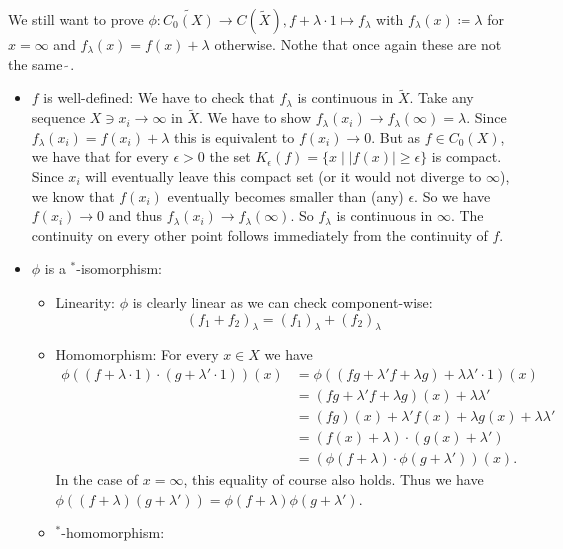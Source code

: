 \documentclass[a4paper]{article}
\begin{document}
\begin{exercise}[2.6]
\begin{itemize}
	\end{itemize}
	We still want to prove $\phi: \widetilde{C_0(X)} \to C(\tilde X), f + \lambda \cdot 1 \mapsto f_\lambda$ with $f_\lambda(x) \coloneq \lambda$ for $x = \infty$ and $f_\lambda(x) = f(x) + \lambda$ otherwise.
	Nothe that once again these are not the same $\tilde{~}$.
	\begin{itemize}
		\item $f$ is well-defined:
		We have to check that $f_\lambda$ is continuous in $\tilde X$.
		Take any sequence $X \ni x_i \to \infty$ in $\tilde X$. We have to show $f_\lambda(x_i) \to f_\lambda(\infty) = \lambda$. Since $f_\lambda(x_i) = f(x_i) + \lambda$ this is equivalent to $f(x_i) \to 0$.
		But as $f \in C_0(X)$, we have that for every $\epsilon > 0$ the set $K_\epsilon(f) = \{ x \mid |f(x)| \geq \epsilon  \}$ is compact.
		Since $x_i$ will eventually leave this compact set (or it would not diverge to $\infty$), we know that $f(x_i)$ eventually becomes smaller than (any) $\epsilon$.
		So we have $f(x_i) \to 0$ and thus $f_\lambda(x_i) \to f_\lambda(\infty)$.
		So $f_\lambda$ is continuous in $\infty$. The continuity on every other point follows immediately from the continuity of $f$.
		\item $\phi$ is a $^*$-isomorphism:
		\begin{itemize}
			\item Linearity: $\phi$ is clearly linear as we can check component-wise:
			\begin{equation*}
				(f_1 + f_2)_\lambda = (f_1)_\lambda + (f_2)_\lambda
			\end{equation*}
			\item Homomorphism: For every $x \in X$ we have
			\begin{align*}
				\phi((f + \lambda \cdot 1) \cdot (g + \lambda' \cdot 1))(x) &= \phi((fg + \lambda' f + \lambda g) + \lambda \lambda' \cdot 1)(x)\\
				&= (fg + \lambda' f + \lambda g)(x) + \lambda \lambda' \\				
				&= (fg)(x) + \lambda' f(x) + \lambda g(x) + \lambda \lambda' \\
				&= (f(x) + \lambda) \cdot (g(x) + \lambda')\\
				&= (\phi(f + \lambda) \cdot \phi(g + \lambda'))(x) \text{.}
			\end{align*}
			In the case of $x = \infty$, this equality of course also holds. Thus we have $\phi((f + \lambda)(g + \lambda'))  = \phi(f + \lambda) \phi(g + \lambda')$.
			\item $^*$-homomorphism: 

\end{itemize}
\end{itemize}
\end{exercise}
\end{document}
